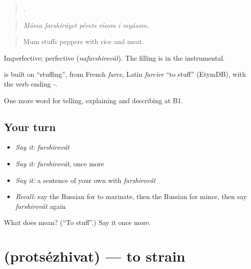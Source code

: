 \begin{quote}
     .
\end{quote}

\begin{quote}
\emph{Máma farshirúyet pérets rísom i myásom.}
\end{quote}

\begin{quote}
Mum stuffs peppers with rice and meat.
\end{quote}

Imperfective; perfective \emph{} (\emph{nafarshirovát}). The filling is in the instrumental.

\begin{cousinweb}
\emph{} is built on \emph{} \textquotedblleft{}stuffing\textquotedblright{}, from French \emph{farce}, Latin \emph{farcīre} \textquotedblleft{}to stuff\textquotedblright{} (EtymDB), with the verb ending \emph{-}.
\end{cousinweb}

\begin{grammarlens}[title={What you've built}]
One more word for telling, explaining and describing at B1.
\end{grammarlens}

\subsection*{Your turn}
\begin{itemize}
\raggedright
  \item \emph{Say it:} \emph{farshirovát}
  \item \emph{Say it:} \emph{farshirovát}, once more
  \item \emph{Say it:} a sentence of your own with \emph{farshirovát}
  \item \emph{Recall:} say the Russian for to marinate, then the Russian for mince, then say \emph{farshirovát} again
\end{itemize}

\begin{tcolorbox}[breakable,colback=teal!4,colframe=teal!35!black,title={Before you move on}]
What does  mean? (\textquotedblleft{}To stuff\textquotedblright{}.) Say it once more.
\end{tcolorbox}
\section[\texorpdfstring{\ru{процеживать} (protsézhivat)}{процеживать (protsézhivat)}]{ (protsézhivat) — to strain}

